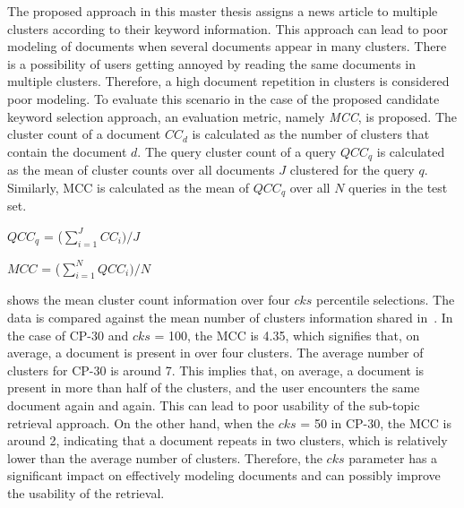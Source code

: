 The proposed approach in this master thesis assigns a news article to multiple clusters according to their keyword information. This approach can lead to poor modeling of documents when several documents appear in many clusters. There is a possibility of users getting annoyed by reading the same documents in multiple clusters. Therefore, a high document repetition in clusters is considered poor modeling. To evaluate this scenario in the case of the proposed candidate keyword selection approach, an evaluation metric, namely \textit{\ac{MCC}}, is proposed. The cluster count of a document $CC_d$ is calculated as the number of clusters that contain the document $d$. The query cluster count of a query $QCC_q$ is calculated as the mean of cluster counts over all documents $J$ clustered for the query $q$. Similarly, \ac{MCC} is calculated as the mean of $QCC_q$ over all $N$ queries in the test set.

\centerline{$QCC_q$ = ($\sum\limits_{i=1}^J CC_i) /J$}
\centerline{$MCC$ = ($\sum\limits_{i=1}^N QCC_i) /N$}

 shows the mean cluster count information over four $cks$ percentile selections. The data is compared against the mean number of clusters information shared in~. In the case of CP-30 and $cks$ = 100, the \ac{MCC} is 4.35, which signifies that, on average, a document is present in over four clusters. The average number of clusters for CP-30 is around 7. This implies that, on average, a document is present in more than half of the clusters, and the user encounters the same document again and again. This can lead to poor usability of the sub-topic retrieval approach. On the other hand, when the $cks$ = 50 in CP-30, the \ac{MCC} is around 2, indicating that a document repeats in two clusters, which is relatively lower than the average number of clusters. Therefore, the $cks$ parameter has a significant impact on effectively modeling documents and can possibly improve the usability of the retrieval.

